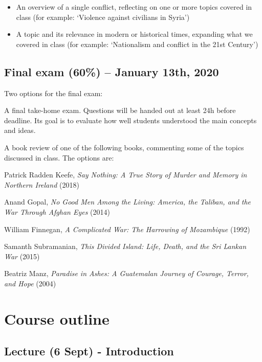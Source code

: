 \documentclass[12pt, a4paper]{article}
\begin{document}
\begin{itemize}
\setlength\itemsep{0pt}
\item[a)] An overview of a single conflict, reflecting on one or more topics covered in class (for example: `Violence against civilians in Syria')
\item[b)] A topic and its relevance in modern or historical times, expanding what we covered in class (for example: `Nationalism and conflict in the 21st Century')
\end{itemize}

\subsection*{Final exam (60\%) -- January 13th, 2020}

Two options for the final exam:

\begin{itemize}
  \item[1.] A final take-home exam. Questions will be handed out at least 24h before deadline. Its goal is to evaluate how well students understood the main concepts and ideas.
  \item[2.] A book review of one of the following books, commenting some of the topics discussed in class. The options are:
  {\small
    \item Patrick Radden Keefe, \textit{Say Nothing: A True Story of Murder and Memory in Northern Ireland} (2018)
    \item Anand Gopal, \textit{No Good Men Among the Living: America, the Taliban, and the War Through Afghan Eyes} (2014)
    \item William Finnegan, \textit{A Complicated War: The Harrowing of Mozambique} (1992)
    \item Samanth Subramanian, \textit{This Divided Island: Life, Death, and the Sri Lankan War} (2015)
    \item Beatriz Manz, \textit{Paradise in Ashes: A Guatemalan Journey of Courage, Terror, and Hope} (2004)
  }
\end{itemize}

\newpage
\section{Course outline}

\subsection*{Lecture (6 Sept) - Introduction}
\end{document}
